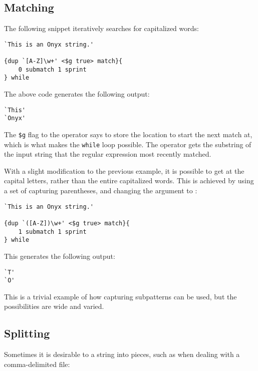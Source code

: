 \subsection{Matching}
The following snippet iteratively searches for capitalized words:

\begin{verbatim}
`This is an Onyx string.'

{dup `[A-Z]\w+' <$g true> match}{
    0 submatch 1 sprint
} while
\end{verbatim}

The above code generates the following output:

\begin{verbatim}
`This'
`Onyx'
\end{verbatim}

The {\tt \$g} flag to the 
operator says to store the location to start the next match at, which is what
makes the {\tt while} loop possible.  The
 operator gets the substring
of the input string that the regular expression most recently matched.

With a slight modification to the previous example, it is possible to get at the
capital letters, rather than the entire capitalized words.  This is achieved by
using a set of capturing parentheses, and changing the argument to
:

\begin{verbatim}
`This is an Onyx string.'

{dup `([A-Z])\w+' <$g true> match}{
    1 submatch 1 sprint
} while
\end{verbatim}

This generates the following output:

\begin{verbatim}
`T'
`O'
\end{verbatim}

This is a trivial example of how capturing subpatterns can be used, but the
possibilities are wide and varied.

\subsection{Splitting}

Sometimes it is desirable to  a
string into pieces, such as when dealing with a comma-delimited file:

